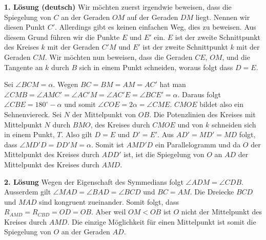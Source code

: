 \textbf{1. Lösung (deutsch)}
Wir möchten zuerst irgendwie beweisen, dass die Spiegelung von $C$ an der Geraden $OM$ auf der Geraden $DM$ liegt. Nennen wir diesen Punkt $C'$. Allerdings gibt es keinen einfachen Weg, dies zu beweisen. 
Aus diesem Grund führen wir die Punkte $E$ und $E'$ ein. $E$ ist der zweite Schnittpunkt des Kreises $k$ mit der Geraden $C'M$ und $E'$ ist der zweite Schnittpunkt $k$ mit der Geraden $CM$. Wir möchten nun beweisen, dass die Geraden $CE$, $OM$, und die Tangente an $k$ durch $B$ sich in einem Punkt schneiden, woraus folgt dass $D = E$. 

Sei $\angle BCM = \alpha$. Wegen $BC = BM = AM = AC'$ hat man $\angle CMB = \angle AMC' = \angle AC'M = \angle AC'E = \angle BCE' = \alpha.$ 
Daraus folgt $\angle CBE = 180^\circ - \alpha$ und somit $\angle COE = 2 \alpha = \angle CME$. $CMOE$ bildet also ein Sehnenviereck. Sei $N$ der Mittelpunkt von $OB$. Die Potenzlinien des Kreises mit Mittelpunkt $N$ durch $BMO$, des Kreises durch $CMOE$ und von $k$ schneiden sich in einem Punkt, $T$. 
Also gilt $D = E$ und $D'=E'$. 
Aus $AD' = MD' = MD$ folgt, dass $\angle MD'D = DD'M = \alpha$. Somit ist $AMD'D$ ein Parallelogramm und da $O$ der Mittelpunkt des Kreises durch $ADD'$ ist, ist die Spiegelung von $O$ an $AD$ der Mittelpunkt des Kreises durch $AMD$. 

\textbf{2. Lösung}
Wegen der Eigenschaft des Symmedians folgt $\angle ADM = \angle CDB$. Ausserdem gilt $\angle MAD = \angle BAD = \angle BCD$ und $BC = AM$. Die Dreiecke $BCD$ und $MAD$ sind kongruent zueinander. 
Somit folgt, dass $R_{AMD}=R_{CBD}=OD=OB$. Aber weil $OM<OB$ ist $O$ nicht der Mittelpunkt des Kreises durch $AMD$. Die einzige Möglichkeit für einen Mittelpunkt ist somit die Spiegelung von $O$ an der Geraden $AD$. 


